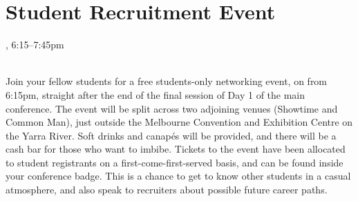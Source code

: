 \clearpage
\section{Student Recruitment Event}
\setheaders{}{\daydateyear}

\begin{center}



\daydateyear, 6:15--7:45pm \vspace{1em}\\
\StudentLunchLoc \\
\end{center}

Join your fellow students for a free students-only networking event, on
\daydate from 6:15pm, straight after the end of the final session of Day
1 of the main conference. The event will be split across two adjoining
venues (Showtime and Common Man), just outside the Melbourne Convention
and Exhibition Centre on the Yarra River.  Soft drinks and canap\'es
will be provided, and there will be a cash bar for those who want to
imbibe. Tickets to the event have been allocated to student registrants
on a first-come-first-served basis, and can be found inside your
conference badge. This is a chance to get to know other students in a
casual atmosphere, and also speak to recruiters about possible future
career paths.
